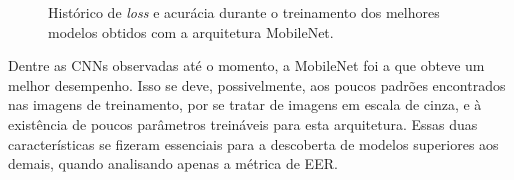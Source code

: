 \begin{figure}[H]
\centering
\caption{Histórico de \emph{loss} e acurácia durante o treinamento dos melhores modelos obtidos com a arquitetura MobileNet.}
\label{fig:treinamento-mobilenet}
\hfill
{}
\hfill
{}
\hfill
{}
\end{figure}

Dentre as CNNs observadas até o momento, a MobileNet foi a que obteve um melhor desempenho. Isso se deve, possivelmente, aos poucos padrões encontrados nas imagens de treinamento, por se tratar de imagens em escala de cinza, e à existência de poucos parâmetros treináveis para esta arquitetura. Essas duas características se fizeram essenciais para a descoberta de modelos superiores aos demais, quando analisando apenas a métrica de EER.

